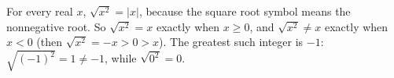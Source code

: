 For every real $x$, $\sqrt{x^2}=|x|$, because the square root symbol means the nonnegative root. So $\sqrt{x^2}=x$ exactly when $x\ge0$, and $\sqrt{x^2}\ne x$ exactly when $x<0$ (then $\sqrt{x^2}=-x>0>x$). The greatest such integer is $\boxed{-1}$: $\sqrt{(-1)^2}=1\ne-1$, while $\sqrt{0^2}=0$.
